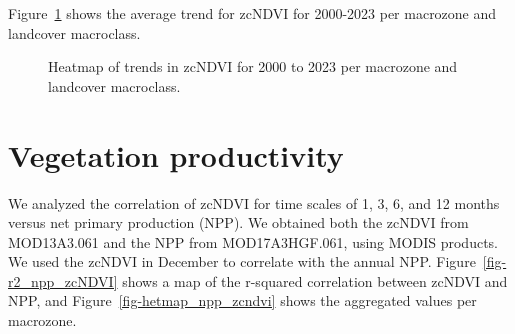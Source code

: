 \documentclass[
  authoryear,
  preprint,
  3p,
  onecolumn]{elsarticle}
\begin{document}
Figure~\ref{fig-hetmaptrendzcNDVI} shows the average trend for zcNDVI
for 2000-2023 per macrozone and landcover macroclass.

\begin{figure}[!ht]


\caption{\label{fig-hetmaptrendzcNDVI}Heatmap of trends in zcNDVI for
2000 to 2023 per macrozone and landcover macroclass.}

\end{figure}%

\section{Vegetation productivity}\label{vegetation-productivity}

We analyzed the correlation of zcNDVI for time scales of 1, 3, 6, and 12
months versus net primary production (NPP). We obtained both the zcNDVI
from MOD13A3.061 and the NPP from MOD17A3HGF.061, using MODIS products.
We used the zcNDVI in December to correlate with the annual NPP.
Figure~\ref{fig-r2_npp_zcNDVI} shows a map of the r-squared correlation
between zcNDVI and NPP, and Figure~\ref{fig-hetmap_npp_zcndvi} shows the
aggregated values per macrozone.
\end{document}

